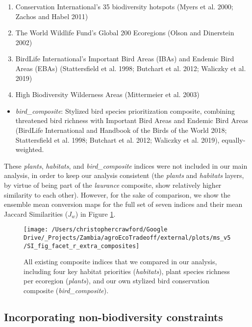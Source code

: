 \documentclass[
]{article}
\providecommand{\tightlist}{%
  \setlength{\itemsep}{0pt}\setlength{\parskip}{0pt}}
\begin{document}
\begin{enumerate}
\def\labelenumi{\arabic{enumi}.}
\tightlist
\item
  Conservation International's 35 biodiversity hotspots (Myers et al. 2000; Zachos and Habel 2011)
\item
  The World Wildlife Fund's Global 200 Ecoregions (Olson and Dinerstein 2002)
\item
  BirdLife International's Important Bird Areas (IBAs) and Endemic Bird Areas (EBAs) (Stattersfield et al. 1998; Butchart et al. 2012; Waliczky et al. 2019)
\item
  High Biodiversity Wilderness Areas (Mittermeier et al. 2003)
\end{enumerate}

\begin{itemize}
\tightlist
\item
  \emph{bird\_composite}: Stylized bird species prioritization composite, combining threatened bird richness with Important Bird Areas and Endemic Bird Areas (BirdLife International and Handbook of the Birds of the World 2018; Stattersfield et al. 1998; Butchart et al. 2012; Waliczky et al. 2019), equally-weighted.
\end{itemize}

These \emph{plants}, \emph{habitats}, and \emph{bird\_composite} indices were not included in our main analysis, in order to keep our analysis consistent (the \emph{plants} and \emph{habitats} layers, by virtue of being part of the \emph{laurance} composite, show relatively higher similarity to each other). However, for the sake of comparison, we show the ensemble mean conversion maps for the full set of seven indices and their mean Jaccard Similarities (\(J_w\)) in Figure \ref{fig:all-composites}.



\begin{figure}
\texttt{[image: /Users/christophercrawford/Google Drive/\_Projects/Zambia/agroEcoTradeoff/external/plots/ms\_v5/SI\_fig\_facet\_r\_extra\_composites]} \caption{All existing composite indices that we compared in our analysis, including four key habitat priorities (\emph{habitats}), plant species richness per ecoregion (\emph{plants}), and our own stylized bird conservation composite (\emph{bird\_composite}).}\label{fig:all-composites}
\end{figure}

\newpage

\hypertarget{weights-results}{%
\subsection{Incorporating non-biodiversity constraints}\label{weights-results}}
\end{document}
